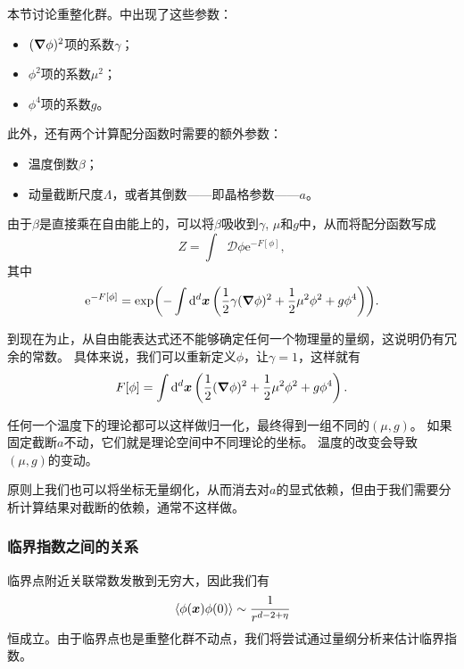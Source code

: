 \documentclass[hyperref, UTF8, a4paper]{ctexart}
\newcommand*{\ee}{\mathrm{e}}
\newcommand*{\fd}[1]{\mathop{}\!\mathcal{D} #1}
\renewcommand{\autoref}{\prettyref}
\begin{document}
本节讨论重整化群。\autoref{eq:phi-4-g}中出现了这些参数：
\begin{itemize}
    \item $(\grad{\phi})^2$项的系数$\gamma$；
    \item $\phi^2$项的系数$\mu^2$；
    \item $\phi^4$项的系数$g$。
\end{itemize}
此外，还有两个计算配分函数时需要的额外参数：
\begin{itemize}
    \item 温度倒数$\beta$；
    \item 动量截断尺度$\Lambda$，或者其倒数——即晶格参数——$a$。
\end{itemize}
由于$\beta$是直接乘在自由能上的，可以将$\beta$吸收到$\gamma$, $\mu$和$g$中，从而将配分函数写成
\[
    Z = \int \fd{\phi} \ee^{-F[\phi]},
\]
其中
\[
    \ee^{-F[\phi]} = \exp(-\int \dd[d]{\vb*{x}} \left(
        \frac{1}{2} \gamma (\grad{\phi})^2 + \frac{1}{2} \mu^2 \phi^2 + g \phi^4
    \right) ).
\]

到现在为止，从自由能表达式还不能够确定任何一个物理量的量纲，这说明仍有冗余的常数。
具体来说，我们可以重新定义$\phi$，让$\gamma=1$，这样就有
\begin{equation}
    F[\phi] = \int \dd[d]{\vb*{x}} \left(
        \frac{1}{2} (\grad{\phi})^2 + \frac{1}{2} \mu^2 \phi^2 + g \phi^4
    \right).
    \label{eq:normalized-phi4}
\end{equation}

任何一个温度下的理论都可以这样做归一化，最终得到一组不同的$(\mu, g)$。
如果固定截断$a$不动，它们就是理论空间中不同理论的坐标。
温度的改变会导致$(\mu, g)$的变动。

原则上我们也可以将坐标无量纲化，从而消去对$a$的显式依赖，但由于我们需要分析计算结果对截断的依赖，通常不这样做。

\subsubsection{临界指数之间的关系}

临界点附近关联常数发散到无穷大，因此我们有
\[
    \expval*{\phi(\vb*{x}) \phi(0)} \sim \frac{1}{r^{d-2+\eta}}
\]
恒成立。由于临界点也是重整化群不动点，我们将尝试通过量纲分析来估计临界指数。
\end{document}
